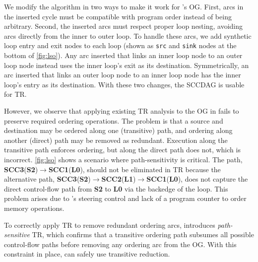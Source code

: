 We modify the algorithm in two ways to make it work for \riptide's OG.
First, arcs in the inserted cycle must be compatible with program order
instead of being arbitrary.  Second, the inserted arcs must
respect proper loop nesting, avoiding arcs directly from the inner to outer
loop.  To handle these arcs, we add synthetic loop entry and exit nodes to
each loop (shown as \texttt{src} and \texttt{sink} nodes at the bottom 
of \autoref{fig:lso}). Any arc inserted %
that links an inner loop node to an outer loop node instead uses the inner 
loop's exit as its destination.
Symmetrically, an arc inserted that links an outer loop node to an inner loop
node has the inner loop's entry as its destination.   With these two changes,
the SCCDAG is usable for TR.
%
%

However, we observe that applying existing TR analysis to the OG in \riptide fails to
preserve required ordering operations.
%
The problem is that a source and destination may be ordered along one
(transitive) path, and ordering along another (direct) path may be removed as
redundant.  Execution along the transitive path enforces ordering, but along the direct path does not, which is incorrect.
%
\autoref{fig:lso} shows a scenario where path-sensitivity is critical.
%
The path, \textbf{SCC3}(\textbf{S2})$\rightarrow$\textbf{SCC1}(\textbf{L0}), should not be eliminated 
in TR because the alternative path, \textbf{SCC3}(\textbf{S2})$\rightarrow$\textbf{SCC2}(\textbf{L1})$\rightarrow$\textbf{SCC1}(\textbf{L0}), does not  capture the direct control-flow path from \textbf{S2} to
\textbf{L0} via the backedge of the loop.
%
This problem arises due to \riptide's steering control and lack of a program
counter to order memory operations.

To correctly apply TR to remove redundant ordering arcs, \riptidecomp introduces
\emph{path-sensitive} TR,
%
which confirms that a transitive ordering path
subsumes all possible control-flow paths
before removing any ordering arc from the OG.
%
With this constraint in place,
\riptide can safely use transitive reduction.

